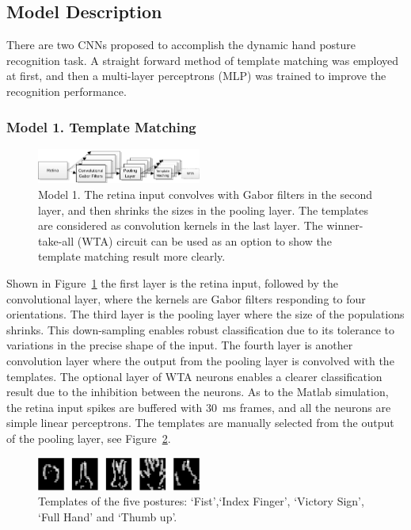 \documentclass[journal]{journal}
\begin{document}
\subsection{Model Description}
\label{sec:mds}
There are two CNNs proposed to accomplish the dynamic hand posture recognition task.
A straight forward method of template matching was employed at first, and then a multi-layer perceptrons (MLP) was trained to improve the recognition performance.
\subsubsection{Model 1. Template Matching}

\begin{figure}
\centering
	\includegraphics[width=0.48\textwidth]{pics/model1.pdf}
	\caption{Model 1. 
	The retina input convolves with Gabor filters in the second layer, and then shrinks the sizes in the pooling layer.
	The templates are considered as convolution kernels in the last layer.
	The winner-take-all (WTA) circuit can be used as an option to show the template matching result more clearly.
	}
	\label{fig:model1}
\end{figure}

Shown in Figure~\ref{fig:model1} the first layer is the retina input, followed by the convolutional layer, where the kernels are Gabor filters responding to four orientations.
The third layer is the pooling layer where the size of the populations shrinks. 
This down-sampling enables robust classification due to its tolerance to variations in the precise shape of the input. 
The fourth layer is another convolution layer where the output from the pooling layer is convolved with the templates.
The optional layer of WTA neurons enables a clearer classification result due to the inhibition between the neurons.
As to the Matlab simulation, the retina input spikes are buffered with 30~ms frames, and all the neurons are simple linear perceptrons.
The templates are manually selected from the output of the pooling layer, see Figure~\ref{fig:template}.

\begin{figure}
\centering
	\includegraphics[width=0.48\textwidth]{pics/gesture.pdf}
	\caption{Templates of the five postures: `Fist',`Index Finger', `Victory Sign', `Full Hand' and `Thumb up'.}
	\label{fig:template}
\end{figure}
\end{document}
